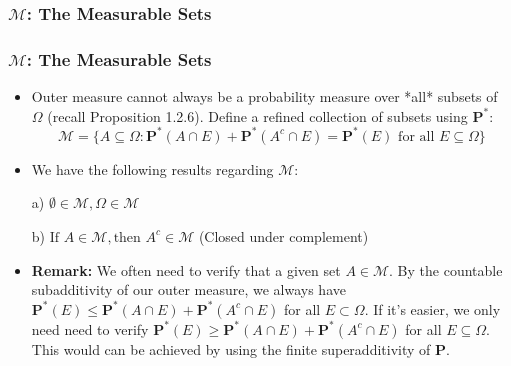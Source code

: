 \documentclass[%
]{beamer}
\newcommand{\BP}{\mathbf{P}}
\begin{document}
\subsubsection{$\mathcal{M}$: The Measurable Sets   }
\frame
{
  \frametitle{$\mathcal{M}$: The Measurable Sets}

   \begin{itemize}

            \item<1-> Outer measure cannot always be a probability measure over *all* subsets of $\Omega$ (recall Proposition 1.2.6). Define a refined collection of subsets using $\BP^*$:
                        $$\mathcal{M}=\{A\subseteq \Omega : \BP^*(A\cap E)+\BP^*(A^c\cap E)=\BP^*(E) \text{ for all }E\subseteq \Omega \}$$
                       
                       
\item<2->   [] \begin{Lemma} We have the following results regarding $\mathcal{M}$:
       
       a) $\emptyset \in \mathcal{M}, \Omega \in \mathcal{M}$
       
       b) $\text{If } A \in \mathcal{M}, \text{then } A^c \in \mathcal{M}$ (Closed under complement)

        \end{Lemma}  
           
           
           \item<3->   \textbf{Remark:} We often need to verify that a given set $A\in \mathcal{M}$. By the countable subadditivity of our outer measure, we always have $\BP^*(E) \leq \BP^*(A\cap E)+\BP^*(A^c\cap E)$ for all $E\subset \Omega$. If it's easier, we only need need to verify  $\BP^*(E) \geq \BP^*(A\cap E)+\BP^*(A^c\cap E)$ for all $E\subseteq \Omega$. This would can be achieved by using the finite superadditivity of $\BP$. 
               
                 \end{itemize}
}
\end{document}
